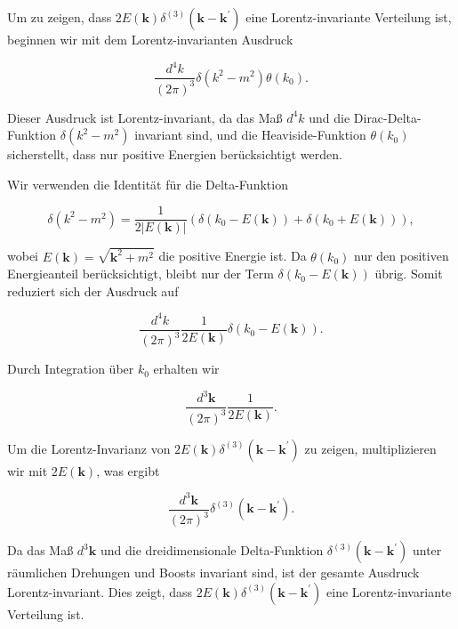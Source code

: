 Um zu zeigen, dass $2 E(\mathbf{k}) \delta^{(3)}\left(\mathbf{k}-\mathbf{k}^{\prime}\right)$ eine Lorentz-invariante Verteilung ist, beginnen wir mit dem Lorentz-invarianten Ausdruck

\[
\frac{d^4 k}{(2 \pi)^3} \delta\left(k^2-m^2\right) \theta\left(k_0\right).
\]

Dieser Ausdruck ist Lorentz-invariant, da das Maß $d^4 k$ und die Dirac-Delta-Funktion $\delta\left(k^2-m^2\right)$ invariant sind, und die Heaviside-Funktion $\theta\left(k_0\right)$ sicherstellt, dass nur positive Energien berücksichtigt werden.

Wir verwenden die Identität für die Delta-Funktion

\[
\delta\left(k^2-m^2\right) = \frac{1}{2|E(\mathbf{k})|} \left( \delta\left(k_0 - E(\mathbf{k})\right) + \delta\left(k_0 + E(\mathbf{k})\right) \right),
\]

wobei $E(\mathbf{k}) = \sqrt{\mathbf{k}^2 + m^2}$ die positive Energie ist. Da $\theta(k_0)$ nur den positiven Energieanteil berücksichtigt, bleibt nur der Term $\delta\left(k_0 - E(\mathbf{k})\right)$ übrig. Somit reduziert sich der Ausdruck auf

\[
\frac{d^4 k}{(2 \pi)^3} \frac{1}{2 E(\mathbf{k})} \delta\left(k_0 - E(\mathbf{k})\right).
\]

Durch Integration über $k_0$ erhalten wir

\[
\frac{d^3 \mathbf{k}}{(2 \pi)^3} \frac{1}{2 E(\mathbf{k})}.
\]

Um die Lorentz-Invarianz von $2 E(\mathbf{k}) \delta^{(3)}\left(\mathbf{k}-\mathbf{k}^{\prime}\right)$ zu zeigen, multiplizieren wir mit $2 E(\mathbf{k})$, was ergibt

\[
\frac{d^3 \mathbf{k}}{(2 \pi)^3} \delta^{(3)}\left(\mathbf{k}-\mathbf{k}^{\prime}\right).
\]

Da das Maß $d^3 \mathbf{k}$ und die dreidimensionale Delta-Funktion $\delta^{(3)}\left(\mathbf{k}-\mathbf{k}^{\prime}\right)$ unter räumlichen Drehungen und Boosts invariant sind, ist der gesamte Ausdruck Lorentz-invariant. Dies zeigt, dass $2 E(\mathbf{k}) \delta^{(3)}\left(\mathbf{k}-\mathbf{k}^{\prime}\right)$ eine Lorentz-invariante Verteilung ist.